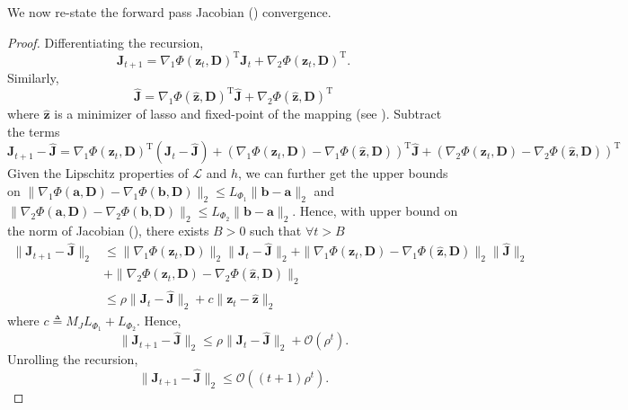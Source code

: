 \documentclass[10pt]{article} %
\newcommand{\D}{{\bm D}}
\newcommand{\J}{{\bm J}}
\newcommand{\z}{{\bm z}}
\newcommand{\Loss}{\mathcal{L}}
\begin{document}
%
%

We now re-state the forward pass Jacobian () convergence.
%
\fwdj*
%
\begin{proof}
Differentiating the recursion,
\begin{equation*}
\J_{t+1} = \nabla_1 \Phi(\z_t, \D)^{\text{T}} \J_t + \nabla_2 \Phi(\z_t, \D)^{\text{T}}.
\end{equation*}
Similarly, 
\begin{equation*}
\hat \J = \nabla_1 \Phi(\hat \z, \D)^{\text{T}} \hat \J + \nabla_2 \Phi(\hat \z, \D)^{\text{T}}
\end{equation*}
where $\hat \z$ is a minimizer of lasso and fixed-point of the mapping (see ). Subtract the terms
\begin{equation*}
\J_{t+1} - \hat \J =  \nabla_1 \Phi(\z_t, \D)^{\text{T}} (\J_t - \hat \J) + (\nabla_1 \Phi(\z_t, \D) - \nabla_1 \Phi(\hat \z, \D))^{\text{T}} \hat \J +  (\nabla_2 \Phi(\z_t, \D) - \nabla_2 \Phi(\hat \z, \D))^{\text{T}}
\end{equation*}
Given the Lipschitz properties of $\Loss$ and $h$, we can further get the upper bounds on $\| \nabla_1 \Phi({\bm a}, \D) - \nabla_1 \Phi({\bm b}, \D) \|_2 \leq L_{\Phi_1} \| {\bm b} - {\bm a} \|_2$ and $\| \nabla_2 \Phi({\bm a}, \D) - \nabla_2 \Phi({\bm b}, \D) \|_2 \leq L_{\Phi_2} \| {\bm b} - {\bm a} \|_2$. Hence, with upper bound on the norm of Jacobian (), there exists $B>0$ such that $\forall t > B$
\begin{equation*}
\begin{aligned}
\| \J_{t+1} - \hat \J \|_2 &\leq  \| \nabla_1 \Phi(\z_t, \D) \|_2 \| \J_t - \hat \J \|_2 + \| \nabla_1 \Phi(\z_t, \D) - \nabla_1 \Phi(\hat \z, \D) \|_2 \| \hat \J \|_2\\
&+  \| \nabla_2 \Phi(\z_t, \D) - \nabla_2 \Phi(\hat \z, \D) \|_2\\
& \leq \rho \| \J_t - \hat \J \|_2 + c \| \z_t - \hat \z \|_2
\end{aligned}
\end{equation*}
where $c \triangleq M_J L_{\Phi_1} + L_{\Phi_2}$. Hence,
\begin{equation*}
\| \J_{t+1} - \hat \J \|_2  \leq \rho \| \J_{t} - \hat \J \|_2 + \mathcal{O}(\rho^t).
\end{equation*}
Unrolling the recursion,
\begin{equation*}
\| \J_{t+1} - \hat \J \|_2  \leq \mathcal{O}((t+1)\rho^t).
\end{equation*}
\end{proof}
\end{document}
